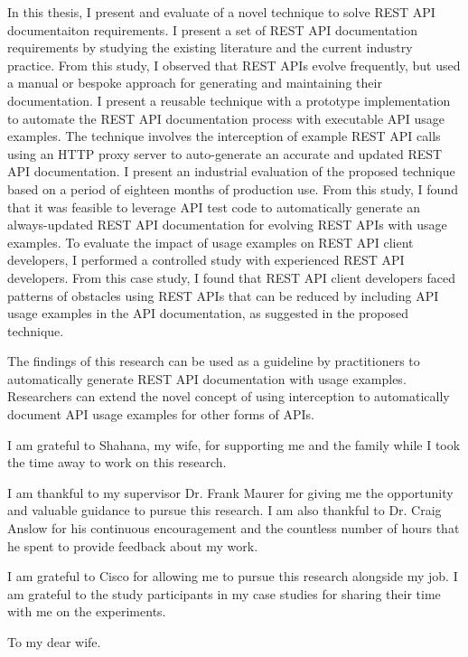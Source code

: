 \documentclass[12pt]{ucalgthes1}
\begin{document}
In this thesis, I present and evaluate of a novel technique to solve REST API documentaiton requirements. I present a set of REST API documentation requirements by studying the existing literature and the current industry practice. From this study, I observed that REST APIs evolve frequently, but used a manual or bespoke approach for generating and maintaining their documentation. I present a reusable technique with a prototype implementation to automate the REST API documentation process with executable API usage examples. The technique involves the interception of example REST API calls using an HTTP proxy server to auto-generate an accurate and updated REST API documentation. I present an industrial evaluation of the proposed technique based on a period of eighteen months of production use. From this study, I found that it was feasible to leverage API test code to automatically generate an always-updated REST API documentation for evolving REST APIs with usage examples. To evaluate the impact of usage examples on REST API client developers, I performed a controlled study with experienced REST API developers. From this case study, I found that REST API client developers faced patterns of obstacles using REST APIs that can be reduced by including API usage examples in the API documentation, as suggested in the proposed technique.

The findings of this research can be used as a guideline by practitioners to automatically generate REST API documentation with usage examples. Researchers can extend the novel concept of using interception to automatically document API usage examples for other forms of APIs.

\newpage
{}
{}
\begin{singlespace}
I am grateful to Shahana, my wife, for supporting me and the family while I took the time away to work on this research.

I am thankful to my supervisor Dr. Frank Maurer for giving me the opportunity and valuable guidance to pursue this research. I am also thankful to Dr. Craig Anslow for his continuous encouragement and the countless number of hours that he spent to provide feedback about my work.

I am grateful to Cisco for allowing me to pursue this research alongside my job. I am grateful to the study participants in my case studies for sharing their time with me on the experiments.
\newpage
{}
{}
\begin{center}
  To my dear wife.
\end{center}
\newpage
{}
\tableofcontents
\pagestyle{plain}
\newpage
{}
\listoftables
\pagestyle{plain}
\newpage
{}
\listoffigures
\pagestyle{plain}
\clearpage
\clearpage          %
\end{singlespace}
\newpage
{}
\end{document}
